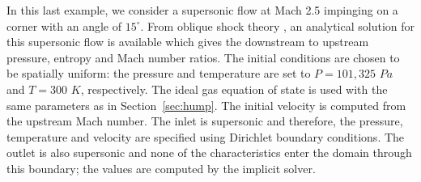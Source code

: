 \documentclass[preprint,10pt]{elsarticle}
\newcommand{\sct}[1]{Section~\ref{#1}}                   %
\begin{document}
In this last example, we consider a supersonic flow at Mach 2.5 impinging on a corner with an angle of $15^\circ$. From oblique shock theory \cite{CompressionCorner}, an analytical solution for this supersonic flow is available which gives the downstream to upstream pressure, entropy and Mach number ratios. 
The initial conditions are chosen to be spatially uniform: the pressure and temperature are set to $P=101,325$ $Pa$ and $T=300$ $K$, respectively.  The ideal gas equation of state is used with the same parameters as in \sct{sec:hump}. The initial velocity is computed from the upstream Mach number. The inlet is supersonic and therefore, the pressure, temperature and velocity are specified using Dirichlet boundary conditions. The outlet is also supersonic and none of the characteristics enter the domain through this boundary; the values are computed by the implicit solver.
\end{document}
